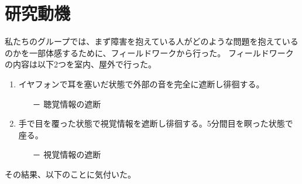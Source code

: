 \section{研究動機}
\noindent\space
私たちのグループでは、まず障害を抱えている人がどのような問題を抱えているのかを一部体感するために、フィールドワークから行った。
フィールドワークの内容は以下2つを室内、屋外で行った。
\begin{enumerate}
  \item イヤフォンで耳を塞いだ状態で外部の音を完全に遮断し徘徊する。
  \begin{itemize}\item[－] 聴覚情報の遮断\end{itemize}
  \item 手で目を覆った状態で視覚情報を遮断し徘徊する。5分間目を瞑った状態で座る。
  \begin{itemize}\item[－] 視覚情報の遮断\end{itemize}
\end{enumerate}
その結果、以下のことに気付いた。
